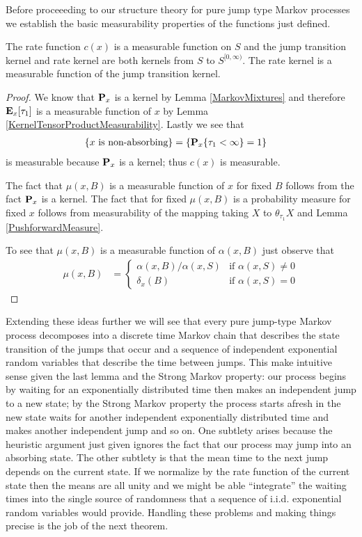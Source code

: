 Before proceeeding to our structure theory for pure jump type Markov
processes we establish the basic measurability properties of the
functions just defined.
\begin{lem}The rate function $c(x)$ is a measurable function on $S$
  and the jump transition kernel and rate kernel are both kernels from
  $S$ to $S^{[0,\infty)}$.  The rate kernel is a measurable function
  of the jump transition kernel.
\end{lem}
\begin{proof}
We know that $\probabilityop_x$ is a kernel by Lemma
\ref{MarkovMixtures} and therefore $\sexpectation{\tau_1}{x}$ is a
measurable function of $x$ by Lemma
\ref{KernelTensorProductMeasurability}.  Lastly we see that 
\begin{align*}
\lbrace x \text{ is non-absorbing} \rbrace &= \lbrace \sprobability{\tau_1 <
  \infty}{x} = 1 \rbrace
\end{align*}
is measurable because $\probabilityop_x$ is a kernel; thus $c(x)$ is measurable.

The fact that $\mu(x,B)$ is a measurable function of $x$ for fixed $B$
follows from the fact $\probabilityop_x$ is a kernel.  The fact that
for fixed $\mu(x,B)$ is a probability measure for fixed $x$ follows
from measurability of the mapping taking $X$ to $\theta_{\tau_1}X$ and
Lemma \ref{PushforwardMeasure}.

To see that $\mu(x,B)$ is a measurable function of $\alpha(x,B)$ just
observe that 
\begin{align*}
\mu(x,B) &= \begin{cases}
\alpha(x,B)/\alpha(x, S) & \text{if $\alpha(x, S)
  \neq 0$} \\
\delta_x(B) & \text{if $\alpha(x, S) = 0$}
\end{cases}
\end{align*}
\end{proof}

Extending these ideas further we will see that every pure jump-type Markov
process decomposes into a discrete time Markov chain that describes
the state transition of the jumps that occur and a sequence of independent exponential random
variables that describe the time between jumps.   This make intuitive sense given the
last lemma and the Strong Markov property: our process begins by
waiting for an exponentially distributed time then makes an
independent jump to a new state; by the Strong Markov property the
process starts afresh in the new state waits for another independent
exponentially distributed time and makes another independent jump and
so on. 
One subtlety arises because the heuristic argument just given
ignores the fact that our process may jump into an absorbing state.
The other subtlety is that the mean time to the next jump depends on
the current state.  If we normalize by the rate function of the
current state then the means are all unity and we might be able
``integrate'' the waiting times into the single source of randomness
that a sequence of i.i.d. exponential random variables would provide.
Handling these problems and making things precise is the job of the
next theorem.


